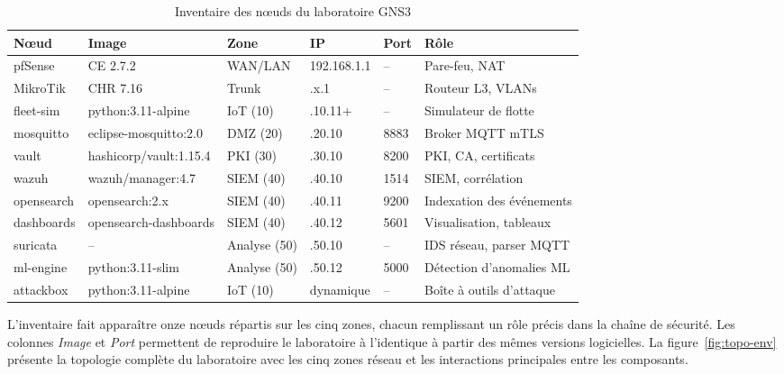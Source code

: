 \begin{table}[!htbp]
\centering
\caption{Inventaire des n\oe{}uds du laboratoire GNS3}
\label{tab:inventaire-noeuds}
\small
\begin{tabularx}{\linewidth}{|l|l|l|l|l|>{\raggedright\arraybackslash}X|}
\hline
\textbf{N\oe{}ud} & \textbf{Image} & \textbf{Zone} & \textbf{IP} & \textbf{Port} & \textbf{Rôle} \\
\hline
pfSense         & CE 2.7.2                & WAN/LAN     & 192.168.1.1   & --   & Pare-feu, NAT              \\ \hline
MikroTik        & CHR 7.16                & Trunk       & .x.1          & --   & Routeur L3, VLANs          \\ \hline
fleet-sim       & python:3.11-alpine      & IoT (10)    & .10.11+       & --   & Simulateur de flotte       \\ \hline
mosquitto       & eclipse-mosquitto:2.0   & DMZ (20)    & .20.10        & 8883 & Broker MQTT mTLS           \\ \hline
vault           & hashicorp/vault:1.15.4  & PKI (30)    & .30.10        & 8200 & PKI, CA, certificats       \\ \hline
wazuh           & wazuh/manager:4.7       & SIEM (40)   & .40.10        & 1514 & SIEM, corrélation          \\ \hline
opensearch      & opensearch:2.x          & SIEM (40)   & .40.11        & 9200 & Indexation des événements   \\ \hline
dashboards      & opensearch-dashboards   & SIEM (40)   & .40.12        & 5601 & Visualisation, tableaux     \\ \hline
suricata        & --                      & Analyse (50)& .50.10        & --   & IDS réseau, parser MQTT    \\ \hline
ml-engine       & python:3.11-slim        & Analyse (50)& .50.12        & 5000 & Détection d'anomalies ML   \\ \hline
attackbox       & python:3.11-alpine      & IoT (10)    & dynamique     & --   & Boîte à outils d'attaque   \\ \hline
\end{tabularx}
\end{table}

L'inventaire fait apparaître onze n\oe{}uds répartis sur les cinq zones, chacun remplissant un rôle précis dans la chaîne de sécurité. Les colonnes \emph{Image} et \emph{Port} permettent de reproduire le laboratoire à l'identique à partir des mêmes versions logicielles. La figure~\ref{fig:topo-env} présente la topologie complète du laboratoire avec les cinq zones réseau et les interactions principales entre les composants.

